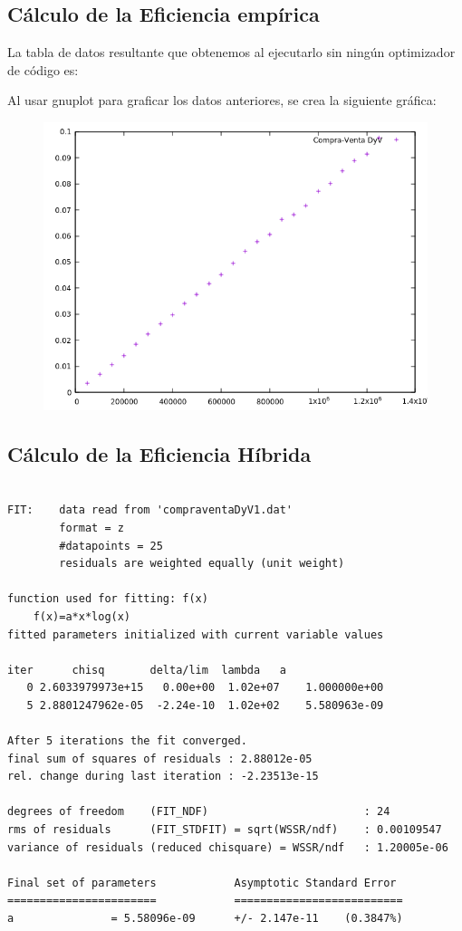 \documentclass[12pt, spanish]{article}
\begin{document}
\subsection{Cálculo de la Eficiencia empírica}
\newpage

La tabla de datos resultante que obtenemos al ejecutarlo sin ningún optimizador de código es:


\newpage

Al usar gnuplot para graficar los datos anteriores, se crea la siguiente gráfica:
\begin{figure}[H]
  \centering
  \includegraphics[scale = 0.8]{DyVwithpoints.png}
\end{figure}
\subsection{Cálculo de la Eficiencia Híbrida}

\begin{verbatim}

FIT:    data read from 'compraventaDyV1.dat'
        format = z
        #datapoints = 25
        residuals are weighted equally (unit weight)

function used for fitting: f(x)
	f(x)=a*x*log(x)
fitted parameters initialized with current variable values

iter      chisq       delta/lim  lambda   a            
   0 2.6033979973e+15   0.00e+00  1.02e+07    1.000000e+00
   5 2.8801247962e-05  -2.24e-10  1.02e+02    5.580963e-09

After 5 iterations the fit converged.
final sum of squares of residuals : 2.88012e-05
rel. change during last iteration : -2.23513e-15

degrees of freedom    (FIT_NDF)                        : 24
rms of residuals      (FIT_STDFIT) = sqrt(WSSR/ndf)    : 0.00109547
variance of residuals (reduced chisquare) = WSSR/ndf   : 1.20005e-06

Final set of parameters            Asymptotic Standard Error
=======================            ==========================
a               = 5.58096e-09      +/- 2.147e-11    (0.3847%)
\end{verbatim}
\end{document}
